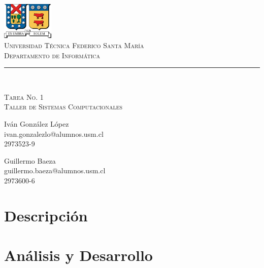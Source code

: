 \documentclass[11pt]{article}
\makeatletter
\newcommand{\labno}{1}
\newcommand{\labtitle}{Taller de Sistemas Computacionales}
\newcommand{\nameone}{Iván González López}
\newcommand{\emailone}{ivan.gonzalezlo@alumnos.usm.cl}
\newcommand{\rolone}{2973523-9}
\newcommand{\nametwo}{Guillermo Baeza}
\newcommand{\emailtwo}{guillermo.baeza@alumnos.usm.cl}
\newcommand{\roltwo}{2973600-6}
\makeatother
\begin{document}
\begin{titlepage}
\begin{center}

\includegraphics[width=70pt]{logos/utfsm.pdf} \\
{\Large \textsc{Universidad Técnica Federico Santa María} \\}
{\Large \textsc{Departamento de Informática} \\ \vspace{4pt}}
{\rule[13pt]{\textwidth}{1pt} \\ \vspace{25pt}}
{\LARGE \textsc{Tarea No. \labno} \\}
{\LARGE \textsc{\labtitle} \\ \vspace{50pt}}

\begin{minipage}{0.4\textwidth}
\begin{flushleft}
{\large \nameone} \\
\emailone \\
\rolone
\end{flushleft}
\end{minipage}
\hfill
\begin{minipage}{0.4\textwidth}
\begin{flushright}
{\large \nametwo} \\
\emailtwo \\
\roltwo
\end{flushright}
\end{minipage}
\end{center}
\end{titlepage}


\section{Descripción}

\section{Análisis y Desarrollo}
\end{document}
